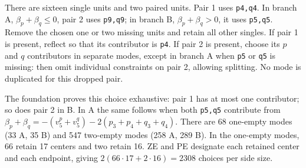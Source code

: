 \documentclass[11pt,a4paper]{article}
\begin{document}
There are sixteen single units and two paired units. Pair 1 uses
\texttt{p4,q4}. In branch A, $\beta_p+\beta_q\le0$, pair 2 uses
\texttt{p9,q9}; in branch B, $\beta_p+\beta_q>0$, it uses
\texttt{p5,q5}. Remove the chosen one or two missing units and retain
all other singles. If pair 1 is present, reflect so that its contributor
is \texttt{p4}. If pair 2 is present, choose its $p$ and $q$ contributors
in separate modes, except in branch A when \texttt{p5} or \texttt{q5}
is missing: then omit individual constraints on pair 2, allowing splitting.
No mode is duplicated for this dropped pair.

The foundation proves this choice exhaustive: pair 1 has at most one
contributor; so does pair 2 in B. In A the same follows when both
\texttt{p5,q5} contribute from
$\beta_p+\beta_q=-(v^p_5+v^q_5)-2(p_3+p_4+q_3+q_4)$.
There are 68 one-empty modes (33 A, 35 B) and 547 two-empty modes
(258 A, 289 B). In the one-empty modes, 66 retain 17 centers and two
retain 16. ZE and PE designate each retained center and each endpoint,
giving $2(66\cdot17+2\cdot16)=2308$ choices per side size.
\end{document}

